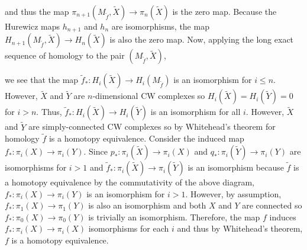 \documentclass[12pt]{extarticle}
\begin{document}
and thus the map $\pi_{n+1}(M_{\tilde{f}}, \tilde{X}) \to \pi_n(\tilde{X})$ is the zero map. Because the Hurewicz maps $h_{n+1}$ and $h_n$ are isomorphisms, the map $H_{n+1}(M_{\tilde{f}}, \tilde{X}) \to H_n(\tilde{X})$ is also the zero map.
Now, applying the long exact sequence of homology to the pair $(M_{\tilde{f}}, \tilde{X})$,
\begin{center}
\end{center}
we see that the map $\tilde{f}_* : H_i(\tilde{X}) \to H_i(M_{\tilde{f}})$ is an isomorphism for $i \le n$. However, $\tilde{X}$ and $\tilde{Y}$ are $n$-dimensional CW complexes so $H_i(\tilde{X}) = H_i(\tilde{Y}) = 0$ for $i > n$. Thus, $\tilde{f}_* : H_i(\tilde{X}) \to H_i(\tilde{Y})$ is an isomorphism for all $i$. However, $\tilde{X}$ and $\tilde{Y}$ are simply-connected CW complexes so by Whitehead's theorem for homology $\tilde{f}$ is a homotopy equivalence. Consider the induced map $f_* : \pi_i(X) \to \pi_i(Y)$. Since $p_* : \pi_i(\tilde{X}) \to \pi_i(X)$ and $q_* : \pi_i(\tilde{Y}) \to \pi_i(Y)$ are isomorphisms for $i > 1$ and $\tilde{f}_* : \pi_i(\tilde{X}) \to \pi_i(\tilde{Y})$ is an isomorphism because $\tilde{f}$ is a homotopy equivalence by the commutativity of the above diagram, $f_* : \pi_i(X) \to \pi_i(Y)$ is an isomorphism for $i > 1$. However, by assumption, $f_* : \pi_1(X) \to \pi_1(Y)$ is also an isomorphism and both $X$ and $Y$ are connected so $f_* : \pi_0(X) \to \pi_0(Y)$ is trivially an isomorphism. Therefore, the map $f$ induces $f_* : \pi_i(X) \to \pi_i(X)$ isomorphisms for each $i$ and thus by Whitehead's theorem, $f$ is a homotopy equivalence.
\end{document}
